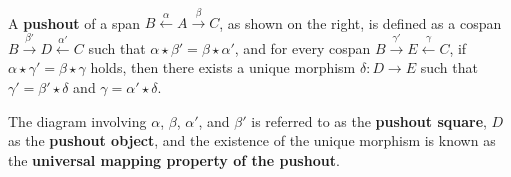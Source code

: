 \begin{definition}
    \label{def:cat:po}
    \ \newline
\noindent
\begin{minipage}{0.7\textwidth}  
    A \textbf{pushout} of a span \( B \overset{\alpha}{\leftarrow} A \overset{\beta}{\rightarrow} C \), as shown on the right, is defined as a cospan \( B \overset{\beta'}{\rightarrow} D \overset{\alpha'}{\leftarrow} C \) such that \( \alpha \mathop{\star} \beta' \mathop{=} \beta \mathop{\star} \alpha' \), and for every cospan \( B \overset{\gamma'}{\rightarrow} E \overset{\gamma}{\leftarrow} C \), if \( \alpha \mathop{\star} \gamma' \mathop{=} \beta \mathop{\star} \gamma \) holds, then there exists a unique morphism \(\delta : D \mathop{\to} E\) such that \( \gamma' \mathop{=} \beta' \mathop{\star} \delta \) and \( \gamma \mathop{=} \alpha' \mathop{\star} \delta \).
\end{minipage}
\hfill
\begin{minipage}{0.299\textwidth}
    \hfill
{}
\end{minipage}
The diagram involving \(\alpha\), \(\beta\), \(\alpha'\), and \(\beta'\) is referred to as the \textbf{pushout square}, \(D\) as the \textbf{pushout object}, and the existence of the unique morphism is known as the \textbf{universal mapping property of the pushout}.
\end{definition} 
